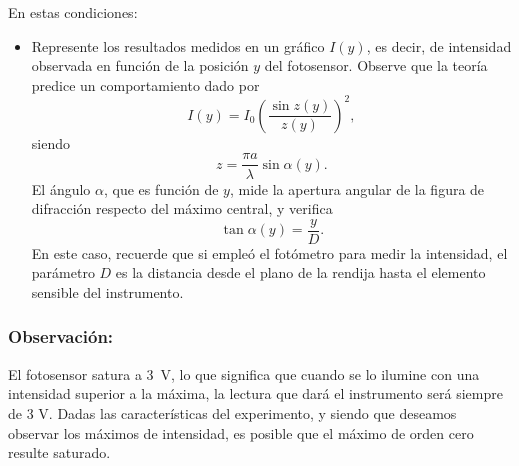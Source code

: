 \documentclass[laboratorio]{guia}
\begin{document}
En estas condiciones:
\begin{itemize}
  \item Represente los resultados medidos en un gráfico \(I(y)\), es decir, de intensidad observada en función de la posición \(y\) del fotosensor.
  Observe que la teoría predice un comportamiento dado por
  \begin{equation}
    I(y) = I_0 \left(\frac{\sin z(y)}{z(y)} \right)^2,
  \end{equation}
  siendo 
  \begin{equation*}
    z = \frac{\pi a}{\lambda} \sin \alpha(y).
  \end{equation*}
  El ángulo \(\alpha\), que es función de \(y\), mide la apertura angular de la figura de difracción respecto del máximo central, y verifica
  \begin{equation}
    \tan \alpha(y) = \frac{y}{D}.
  \end{equation}
  En este caso, recuerde que si empleó el fotómetro para medir la intensidad, el parámetro \(D\) es la distancia desde el plano de la rendija hasta el elemento sensible del instrumento.
\end{itemize}


\subsubsection*{Observación:}

El fotosensor satura a \SI{3}{\volt}, lo que significa que cuando se lo ilumine con una intensidad superior a la máxima, la lectura que dará el instrumento será siempre de 3 V.
Dadas las características del experimento, y siendo que deseamos observar los máximos de intensidad, es posible que el máximo de orden cero resulte saturado. 



\nocite{Alonso1998,Jenkins2001,Hecht1986}
 

\end{document}
